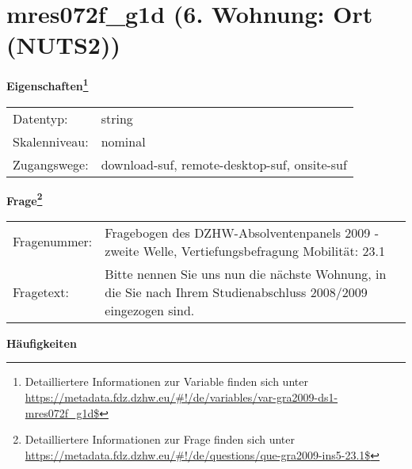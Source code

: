 
    \setcounter{footnote}{0}

    \vspace*{-1.8cm}
	\section{mres072f\_g1d (6. Wohnung: Ort (NUTS2))}
	\label{section:mres072f_g1d}



    \vspace*{0.5cm}
    \noindent\textbf{Eigenschaften\footnote{Detailliertere Informationen zur Variable finden sich unter
		\url{https://metadata.fdz.dzhw.eu/\#!/de/variables/var-gra2009-ds1-mres072f_g1d$}}}\\
	\begin{tabularx}{\hsize}{@{}lX}
	Datentyp: & string \\
	Skalenniveau: & nominal \\
	Zugangswege: &
	  download-suf, 
	  remote-desktop-suf, 
	  onsite-suf
 \\
    \end{tabularx}



				\vspace*{0.5cm}
                \noindent\textbf{Frage\footnote{Detailliertere Informationen zur Frage finden sich unter
		              \url{https://metadata.fdz.dzhw.eu/\#!/de/questions/que-gra2009-ins5-23.1$}}}\\
				\begin{tabularx}{\hsize}{@{}lX}
					Fragenummer: &
					  Fragebogen des DZHW-Absolventenpanels 2009 - zweite Welle, Vertiefungsbefragung Mobilität:
					  23.1
 \\
					Fragetext: & Bitte nennen Sie uns nun die nächste Wohnung, in die Sie nach Ihrem Studienabschluss 2008/2009 eingezogen sind. \\
				\end{tabularx}





        		\vspace*{0.5cm}
                \noindent\textbf{Häufigkeiten}

